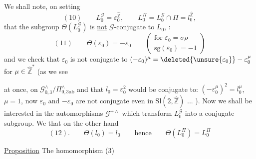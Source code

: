 We shall note,  on setting
\[
(10)\qquad L_{0}^{\mathcal{G}}=\varepsilon_{0}^{\widehat{\mathbb{Z}}},\qquad
L_{0}^{\Pi}=L_{0}^{\mathcal{G}}\cap\Pi=l_{0}^{\widehat{\mathbb{Z}}},
\]
that the subgroup $\Theta(L_{0}^{\mathcal{G}})$
is \uline{not} $\mathcal{G}$-conjugate to $L_{0}$,
 
 
\deleted{\unsure{$\Theta\varepsilon$}} :
\[
(11)\qquad \Theta(\varepsilon_{0})=-\varepsilon_{0}
\qquad\left(\begin{gathered}
\text{for }\varepsilon_{0}=\sigma\rho\\
\mathrm{sg}(\varepsilon_{0})=-1
\end{gathered}\right)
\]
and we check that $\varepsilon_{0}$ is not conjugate to
$(-\varepsilon_{0})^{\mu}=\deleted{\unsure{\varepsilon_{0}}}-\varepsilon_{0}^{\mu}$
for  $\mu\in\widehat{\mathbb{Z}}^{*}$ (as we see




at once, on 
$\mathcal{G}_{0,3}^{\wedge}/\Pi_{0,3}^{\wedge}{}_{\mathrm{ab}}$
and  that $l_{0}=\varepsilon_{0}^{2}$ would be
conjugate to: $(-\varepsilon_{0}^{\mu})^{2}=l_{0}^{\mu}$,
 $\mu=1$, now
$\varepsilon_{0}$ and $-\varepsilon_{0}$ are not conjugate
even in $\mathrm{Sl}(2,\widehat{\mathbb{Z}})$ ... ). Now we shall
be interested  in the automorphisms 
$\mathcal{G}^{+\wedge}$ which transform $L_{0}^{\mathcal{G}}$ into a
conjugate subgroup. We  that on the other hand
\[
(12).\qquad \Theta(l_{0})=l_{0}\qquad\text{hence}\qquad
\Theta(L_{0}^{\Pi})=L_{0}^{\Pi}
\]

\uline{Proposition} The homomorphism (3)

